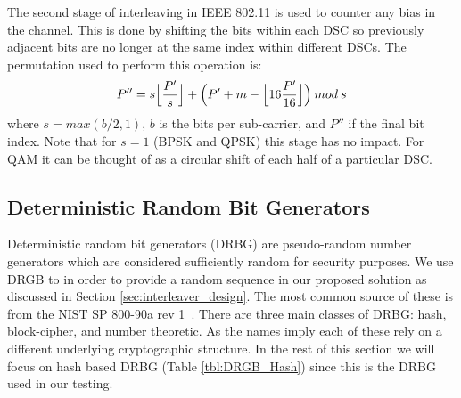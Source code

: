 \documentclass[sigconf]{acmart}
\begin{document}
The second stage of interleaving in IEEE 802.11 is used to counter any bias in the channel. This is done by shifting the bits within each DSC so previously adjacent bits are no longer at the same index within different DSCs. The permutation used to perform this operation is:
$$P''= s \Bigl\lfloor \frac{P'}{s} \Bigr\rfloor + \Bigl(P' + m - \Bigl\lfloor 16 \frac{P'}{16} \Bigr\rfloor \Bigr)\: mod \: s$$
where $s=max(b/2, 1)$, $b$ is the bits per sub-carrier, and $P''$ if the final bit index. Note that for $s=1$ (BPSK and QPSK) this stage has no impact. For QAM it can be thought of as a circular shift of each half of a particular DSC. 

\subsection{Deterministic Random Bit Generators}

Deterministic random bit generators (DRBG) are pseudo-random number generators which are considered sufficiently random for security purposes. We use DRGB to in order to provide a random sequence in our proposed solution as discussed in Section \ref{sec:interleaver_design}. The most common source of these is from the NIST SP 800-90a rev 1~\cite{barker2015nist90a}. There are three main classes of DRBG: hash, block-cipher, and number theoretic. As the names imply each of these rely on a different underlying cryptographic structure. In the rest of this section we will focus on hash based DRBG (Table \ref{tbl:DRGB_Hash}) since this is the DRBG used in our testing. 

\end{document}
